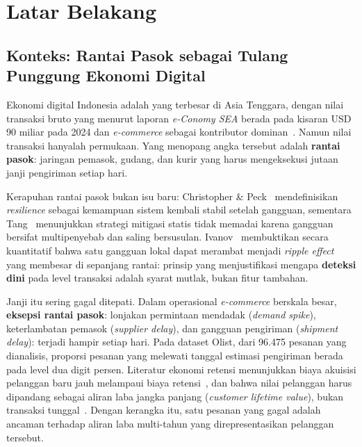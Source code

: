\documentclass[12pt,a4paper]{article}
\begin{document}
{\tableofcontents}
\newpage

\section{Latar Belakang}

\subsection{Konteks: Rantai Pasok sebagai Tulang Punggung Ekonomi Digital}

Ekonomi digital Indonesia adalah yang terbesar di Asia Tenggara, dengan nilai transaksi bruto yang menurut laporan \textit{e-Conomy SEA} berada pada kisaran USD 90 miliar pada 2024 dan \textit{e-commerce} sebagai kontributor dominan~\cite{econsea}. Namun nilai transaksi hanyalah permukaan. Yang menopang angka tersebut adalah \textbf{rantai pasok}: jaringan pemasok, gudang, dan kurir yang harus mengeksekusi jutaan janji pengiriman setiap hari.

Kerapuhan rantai pasok bukan isu baru: Christopher \& Peck~\cite{christopher} mendefinisikan \textit{resilience} sebagai kemampuan sistem kembali stabil setelah gangguan, sementara Tang~\cite{tang} menunjukkan strategi mitigasi statis tidak memadai karena gangguan bersifat multipenyebab dan saling bersusulan. Ivanov~\cite{ivanov} membuktikan secara kuantitatif bahwa satu gangguan lokal dapat merambat menjadi \textit{ripple effect} yang membesar di sepanjang rantai: prinsip yang menjustifikasi mengapa \textbf{deteksi dini} pada level transaksi adalah syarat mutlak, bukan fitur tambahan.

Janji itu sering gagal ditepati. Dalam operasional \textit{e-commerce} berskala besar, \textbf{eksepsi rantai pasok}: lonjakan permintaan mendadak (\textit{demand spike}), keterlambatan pemasok (\textit{supplier delay}), dan gangguan pengiriman (\textit{shipment delay}): terjadi hampir setiap hari. Pada dataset Olist, dari 96.475 pesanan yang dianalisis, proporsi pesanan yang melewati tanggal estimasi pengiriman berada pada level dua digit persen. Literatur ekonomi retensi menunjukkan biaya akuisisi pelanggan baru jauh melampaui biaya retensi~\cite{reichheld}, dan bahwa nilai pelanggan harus dipandang sebagai aliran laba jangka panjang (\textit{customer lifetime value}), bukan transaksi tunggal~\cite{gupta}. Dengan kerangka itu, satu pesanan yang gagal adalah ancaman terhadap aliran laba multi-tahun yang direpresentasikan pelanggan tersebut.
\end{document}
